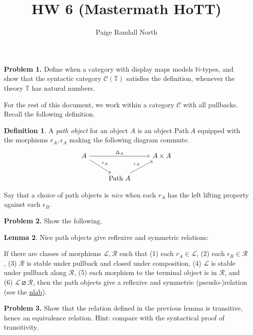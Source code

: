 \documentclass{article}
\title{HW 6 (Mastermath HoTT)}
\author{Paige Randall North}
\theoremstyle{definition}
\newtheorem{definition}{Definition}[section]
\newtheorem{lemma}[definition]{Lemma}
\newcommand{\Path}{\mathrm {Path} \ }
\begin{document}
\maketitle

\noindent\textbf{Problem 1.} Define when a category with display maps models $\mathbb{N}$-types, and show that the syntactic category $\mathcal{C}(\mathbb{T})$ satisfies the definition, whenever the theory $\mathbb{T}$ has natural numbers.

\hspace{1em}

For the rest of this document, we work within a category $\mathcal C$ with all pullbacks.
Recall the following definition.

\begin{definition}
  A \emph{path object} for an object $A$ is an object $\Path A$ equipped with the morphisms $r_A, \epsilon_A$ making the following diagram commute.
  \[
    \begin{tikzcd}
      A \ar[dr, "r_A"] \ar[rr,"\Delta_A"]& & A \times A \\
      & \Path A \ar[ur,"\epsilon_A"]
    \end{tikzcd}
  \]

  Say that a choice of path objects is \emph{nice} when each $r_A$ has the left lifting property against each $\epsilon_B$.
\end{definition}

\noindent\textbf{Problem 2.} Show the following.

\begin{lemma}
  \label{lem:equivalence relation}
  Nice path objects give reflexive and symmetric relations:

  If there are classes of morphisms $\mathcal L, \mathcal R$ such that (1) each $r_A \in \mathcal L$, (2) each $\epsilon_B \in \mathcal R$, (3) $\mathcal R$ is stable under pullback and closed under composition, (4) $\mathcal L$ is stable under pullback along $\mathcal R$, (5) each morphism to the terminal object is in $\mathcal R$, and (6) $\mathcal L \boxslash \mathcal R$, then the path objects give a reflexive and symmetric (pseudo-)relation (see the \href{https://ncatlab.org/nlab/show/internal+pseudo-equivalence+relation}{nlab}).
\end{lemma}

\noindent\textbf{Problem 3.} Show that the relation defined in the previous lemma is transitive, hence an equivalence relation. Hint: compare with the syntactical proof of transitivity.
\end{document}
